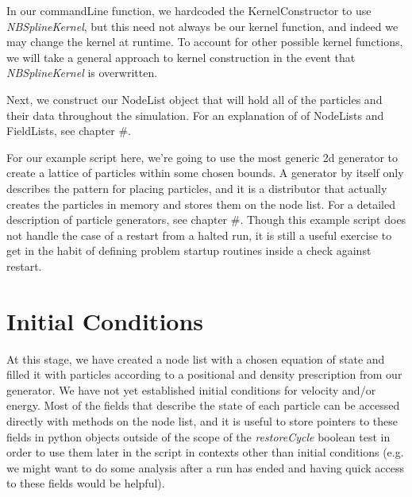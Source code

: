 \documentclass[11pt]{memoir}
\begin{document}
In our commandLine function, we hardcoded the KernelConstructor to use \textit{NBSplineKernel}, but this need not always be our kernel function, and indeed we may change the kernel at runtime.
To account for other possible kernel functions, we will take a general approach to kernel construction in the event that \textit{NBSplineKernel} is overwritten.



Next, we construct our NodeList object that will hold all of the particles and their data throughout the simulation.
For an explanation of of NodeLists and FieldLists, see chapter \#.



For our example script here, we're going to use the most generic 2d generator to create a lattice of particles within some chosen bounds.
A generator by itself only describes the pattern for placing particles, and it is a distributor that actually creates the particles in memory and stores them on the node list.
For a detailed description of particle generators, see chapter \#.
Though this example script does not handle the case of a restart from a halted run, it is still a useful exercise to get in the habit of defining problem startup routines inside a check against restart.



\section{Initial Conditions}

At this stage, we have created a node list with a chosen equation of state and filled it with particles according to a positional and density prescription from our generator.
We have not yet established initial conditions for velocity and/or energy.
Most of the fields that describe the state of each particle can be accessed directly with methods on the node list, and it is useful to store pointers to these fields in python objects outside of the scope of the \textit{restoreCycle} boolean test in order to use them later in the script in contexts other than initial conditions (e.g. we might want to do some analysis after a run has ended and having quick access to these fields would be helpful).
\end{document}
